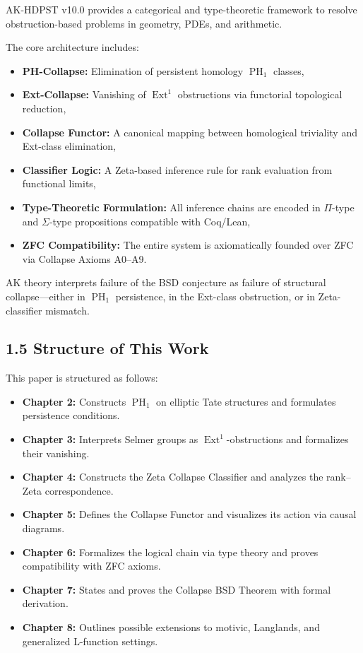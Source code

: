 \documentclass[11pt]{article}
\DeclareMathOperator{\Ext}{Ext}
\DeclareMathOperator{\PH}{PH}
\begin{document}
AK-HDPST v10.0 provides a categorical and type-theoretic framework to resolve obstruction-based problems in geometry, PDEs, and arithmetic.

The core architecture includes:
\begin{itemize}
  \item \textbf{PH-Collapse:} Elimination of persistent homology $\PH_1$ classes,
  \item \textbf{Ext-Collapse:} Vanishing of $\Ext^1$ obstructions via functorial topological reduction,
  \item \textbf{Collapse Functor:} A canonical mapping between homological triviality and Ext-class elimination,
  \item \textbf{Classifier Logic:} A Zeta-based inference rule for rank evaluation from functional limits,
  \item \textbf{Type-Theoretic Formulation:} All inference chains are encoded in $\Pi$-type and $\Sigma$-type propositions compatible with Coq/Lean,
  \item \textbf{ZFC Compatibility:} The entire system is axiomatically founded over ZFC via Collapse Axioms A0–A9.
\end{itemize}

AK theory interprets failure of the BSD conjecture as failure of structural collapse—either in $\PH_1$ persistence, in the Ext-class obstruction, or in Zeta-classifier mismatch.

\subsection{1.5 Structure of This Work}

This paper is structured as follows:

\begin{itemize}
  \item \textbf{Chapter 2:} Constructs $\PH_1$ on elliptic Tate structures and formulates persistence conditions.
  \item \textbf{Chapter 3:} Interprets Selmer groups as $\Ext^1$-obstructions and formalizes their vanishing.
  \item \textbf{Chapter 4:} Constructs the Zeta Collapse Classifier and analyzes the rank–Zeta correspondence.
  \item \textbf{Chapter 5:} Defines the Collapse Functor and visualizes its action via causal diagrams.
  \item \textbf{Chapter 6:} Formalizes the logical chain via type theory and proves compatibility with ZFC axioms.
  \item \textbf{Chapter 7:} States and proves the Collapse BSD Theorem with formal derivation.
  \item \textbf{Chapter 8:} Outlines possible extensions to motivic, Langlands, and generalized L-function settings.
\end{itemize}
\end{document}
